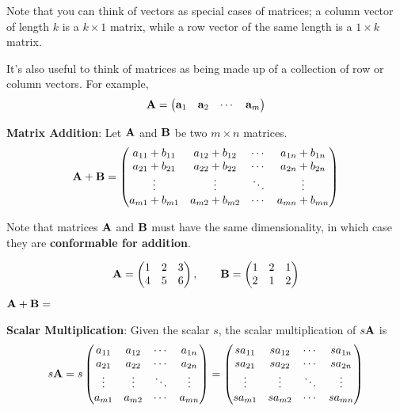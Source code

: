 \documentclass[]{book}
\theoremstyle{definition}
\theoremstyle{definition}
\theoremstyle{definition}
\theoremstyle{remark}
\let\BeginKnitrBlock\begin \let\EndKnitrBlock\end
\begin{document}
Note that you can think of vectors as special cases of matrices; a
column vector of length \(k\) is a \(k \times 1\) matrix, while a row
vector of the same length is a \(1 \times k\) matrix.

It's also useful to think of matrices as being made up of a collection
of row or column vectors. For example,
\[\bf A = \begin{pmatrix} {\bf a}_1 & {\bf a}_2 &  \cdots & {\bf a}_m \end{pmatrix}\]

\textbf{Matrix Addition}: Let \(\bf A\) and \(\bf B\) be two
\(m\times n\) matrices. \[{\bf A+B}=\begin{pmatrix}
            a_{11}+b_{11} & a_{12}+b_{12} & \cdots & a_{1n}+b_{1n} \\
            a_{21}+b_{21} & a_{22}+b_{22} & \cdots & a_{2n}+b_{2n} \\
            \vdots & \vdots  & \ddots & \vdots \\
            a_{m1}+b_{m1} & a_{m2}+b_{m2} & \cdots & a_{mn}+b_{mn}
        \end{pmatrix}\]

Note that matrices \({\bf A}\) and \({\bf B}\) must have the same
dimensionality, in which case they are \textbf{conformable for
addition}.

\BeginKnitrBlock{example}
\protect\hypertarget{exm:matrixaddition}{}{\label{exm:matrixaddition}
}\[{\bf A}=\begin{pmatrix} 1 & 2 & 3 \\ 4 & 5 & 6 \end{pmatrix}, \qquad
            {\bf B}=\begin{pmatrix} 1 & 2 & 1 \\ 2 & 1 & 2 \end{pmatrix}\]
\({\bf A+B}=\)
\EndKnitrBlock{example}

\textbf{Scalar Multiplication}: Given the scalar \(s\), the scalar
multiplication of \(s {\bf A}\) is \[ s {\bf A}=  s \begin{pmatrix}
            a_{11} & a_{12} & \cdots & a_{1n} \\
            a_{21} & a_{22} & \cdots & a_{2n} \\
            \vdots & \vdots & \ddots & \vdots \\
            a_{m1} & a_{m2} & \cdots & a_{mn}
        \end{pmatrix}
        = \begin{pmatrix}
            s a_{11} & s a_{12} & \cdots & s a_{1n} \\
            s a_{21} & s a_{22} & \cdots & s a_{2n} \\
            \vdots & \vdots & \ddots & \vdots \\
            s a_{m1} & s a_{m2} & \cdots & s a_{mn}
        \end{pmatrix}\]
\end{document}
